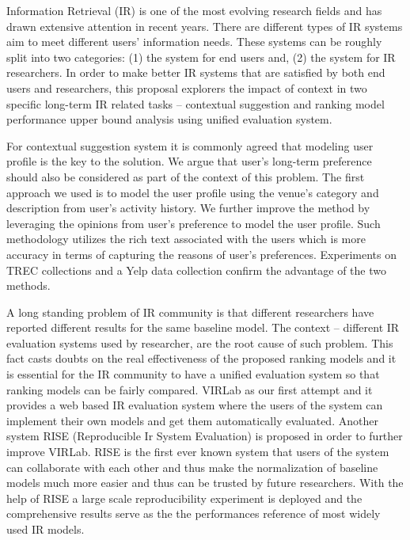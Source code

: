 %
%
Information Retrieval (IR) is one of the most evolving research fields 
and has drawn extensive attention in recent years. 
There are different types of IR systems aim to meet different users' 
information needs. 
These systems can be roughly split into two categories: 
(1) the system for end users and, 
(2) the system for IR researchers.
In order to make better IR systems that are satisfied by both end users 
and researchers, this proposal explorers the impact of 
context in two specific long-term IR related tasks -- contextual suggestion 
and ranking model performance upper bound analysis using unified evaluation 
system.

For contextual suggestion system it is commonly agreed that modeling user 
profile is the key to the solution. We argue that user's long-term 
preference should also be considered as part of the context of this problem. 
The first approach we used is to model the user profile using the venue's 
category and description from user's activity history. 
We further improve the method by leveraging the opinions from user's 
preference to model the user profile. Such methodology utilizes the rich 
text associated with the users which is more accuracy in terms of capturing 
the reasons of user's preferences. 
Experiments on TREC collections and a Yelp data collection confirm the 
advantage of the two methods.

A long standing problem of IR community is that different researchers 
have reported different results for the same baseline model. 
The context -- different IR evaluation systems used by researcher, 
are the root cause of such problem. This fact casts doubts on the real 
effectiveness of the proposed ranking models and it is essential for 
the IR community to have a unified evaluation system so that ranking 
models can be fairly compared.
VIRLab as our first attempt and it provides a web based IR evaluation system 
where the users of the system can implement their own models and get them 
automatically evaluated.
Another system RISE (Reproducible Ir System Evaluation) is proposed in order 
to further improve VIRLab.
RISE is the first ever known system that users of the system can collaborate 
with each other and thus make the normalization of baseline models much more 
easier and thus can be trusted by future researchers. 
With the help of RISE a large scale reproducibility experiment is deployed 
and the comprehensive results serve as the the performances reference of 
most widely used IR models.

